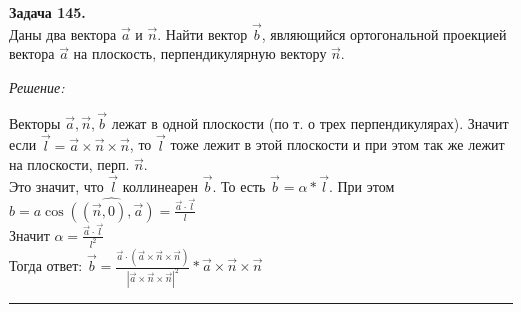 \documentclass[a4paper, 12pt]{article}
\newenvironment{problem}[2][Задача]
    { \begin{mdframed}[backgroundcolor=gray!10] \textbf{#1 #2.} \\}
    {  \end{mdframed}}
\newenvironment{solution}
    {\textit{Решение: }}
    {\noindent\rule{7in}{1.5pt}}
\begin{document}
\begin{problem}{145}
Даны два вектора $\vec a$ и $\vec n$. Найти вектор $\vec b$, являющийся ортогональной проекцией вектора $\vec a$
на плоскость, перпендикулярную вектору $\vec n$.
\end{problem}
\begin{solution}

Векторы $\overrightarrow{a}, \overrightarrow{n}, \overrightarrow{b}$ лежат в одной плоскости (по т. о трех перпендикулярах).
Значит если
$\overrightarrow{l}=\overrightarrow{a}\times\overrightarrow{n}\times\overrightarrow{n}$,
то $\overrightarrow{l}$ тоже лежит в этой плоскости
и при этом так же лежит на плоскости, перп. $\overrightarrow{n}$. \\
Это значит, что $\overrightarrow{l}$ коллинеарен $\overrightarrow{b}$. То есть $\overrightarrow{b} = \alpha * \overrightarrow{l}$.
При этом $b=a\cos{\hat{((\overrightarrow{n}, 0), \overrightarrow{a})}}=
\frac{\overrightarrow{a} \cdot \overrightarrow{l}}{l}$ \\
Значит $\alpha = \frac{\overrightarrow{a} \cdot \overrightarrow{l}}{l^2}$
\\
Тогда ответ: $\overrightarrow{b}=\frac{\overrightarrow{a} \cdot (\overrightarrow{a}\times\overrightarrow{n}\times\overrightarrow{n})}{|\overrightarrow{a}\times\overrightarrow{n}\times\overrightarrow{n}|^2} * \overrightarrow{a}\times\overrightarrow{n}\times\overrightarrow{n}$

\end{solution}
\end{document}
